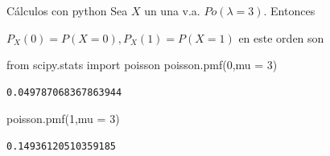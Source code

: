 \documentclass[
  ignorenonframetext,
  aspectratio=169]{beamer}
\newenvironment{Shaded}{\begin{snugshade}}{\end{snugshade}}
\newcommand{\DecValTok}[1]{\textcolor[rgb]{0.68,0.00,0.00}{#1}}
\newcommand{\ImportTok}[1]{\textcolor[rgb]{0.00,0.46,0.62}{#1}}
\newcommand{\NormalTok}[1]{\textcolor[rgb]{0.00,0.23,0.31}{#1}}
\newcommand{\OperatorTok}[1]{\textcolor[rgb]{0.37,0.37,0.37}{#1}}
\begin{document}
\begin{frame}[fragile]{Cálculos con python}
\protect\hypertarget{cuxe1lculos-con-python-4}{}
Sea \(X\) un una v.a. \(Po(\lambda=3)\). Entonces

\(P_X(0)=P(X=0), P_X(1)=P(X=1)\) en este orden son

\begin{Shaded}
\begin{Highlighting}[]
\ImportTok{from}\NormalTok{ scipy.stats }\ImportTok{import}\NormalTok{ poisson}
\NormalTok{poisson.pmf(}\DecValTok{0}\NormalTok{,mu }\OperatorTok{=} \DecValTok{3}\NormalTok{)}
\end{Highlighting}
\end{Shaded}

\begin{verbatim}
0.049787068367863944
\end{verbatim}

\begin{Shaded}
\begin{Highlighting}[]
\NormalTok{poisson.pmf(}\DecValTok{1}\NormalTok{,mu }\OperatorTok{=} \DecValTok{3}\NormalTok{)}
\end{Highlighting}
\end{Shaded}

\begin{verbatim}
0.14936120510359185
\end{verbatim}
\end{frame}
\end{document}
